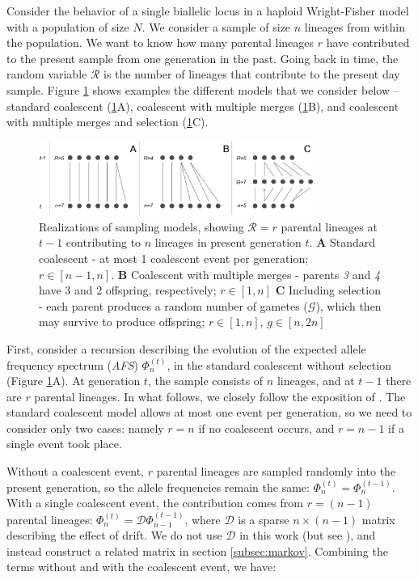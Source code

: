 \documentclass[review]{elsarticle}
\begin{document}
Consider the behavior of a single biallelic locus in a haploid Wright-Fisher model with a population
of size $N$. We consider a sample of size $n$ lineages from within the population. We want to know
how many parental lineages $r$ have contributed to the present sample from one generation in the
past. Going back in time, the random variable $\mathcal{R}$ is the number of lineages that
contribute to the present day sample. Figure \ref{fig:schematic} shows examples the different models
that we consider below -- standard coalescent (\ref{fig:schematic}A), coalescent with multiple
merges (\ref{fig:schematic}B), and coalescent with multiple merges and selection
(\ref{fig:schematic}C).

\begin{figure}[ht]
  \centering
  \includegraphics[width=0.8\textwidth]{fig/schematic.pdf}
  \caption{\label{fig:schematic} Realizations of sampling models, showing $\mathcal{R}=r$ parental
    lineages at $t-1$ contributing to $n$ lineages in present generation $t$. \textbf{A} Standard
    coalescent - at most 1 coalescent event per generation; $r\in[n-1, n]$. \textbf{B} Coalescent
    with multiple merges - parents \textit{3} and \textit{4} have 3 and 2 offspring, respectively;
    $r \in [1, n]$ \textbf{C} Including selection - each parent produces a random number of gametes
    ($\mathcal{G}$), which then may survive to produce offspring; $r \in [1, n]$, $g \in [n, 2n]$ }
\end{figure}

First, consider a recursion describing the evolution of the expected allele frequency spectrum
(\textit{AFS}) $\Phi_{n}^{(t)}$, in the standard coalescent without selection (Figure
\ref{fig:schematic}A). At generation $t$, the sample consists of $n$ lineages, and at $t-1$ there
are $r$ parental lineages. In what follows, we closely follow the exposition of
\cite{JouganousEtAl2017}. The standard coalescent model allows at most one event per generation, so
we need to consider only two cases: namely $r=n$ if no coalescent occurs, and $r=n-1$ if a single
event took place.

Without a coalescent event, $r$ parental lineages are sampled randomly into the present generation,
so the allele frequencies remain the same: $\Phi_{n}^{(t)}=\Phi_{n}^{(t-1)}$. With a single
coalescent event, the contribution comes from $r=(n-1)$ parental lineages:
$\Phi_{n}^{(t)}=\mathcal{D}\Phi_{n-1}^{(t-1)}$, where $\mathcal{D}$ is a sparse $n \times (n-1)$
matrix describing the effect of drift. We do not use $\mathcal{D}$ in this work (but see
\citep{JouganousEtAl2017}), and instead construct a related matrix in section \ref{subsec:markov}.
Combining the terms without and with the coalescent event, we have:
\end{document}
